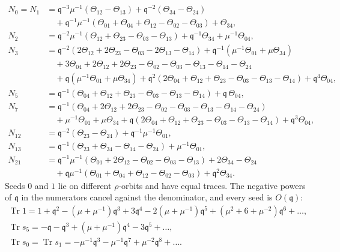 \documentclass[11pt]{amsart}
\DeclareMathOperator{\Tr}{Tr}
\newcommand\fq{\mathfrak{q}}
\theoremstyle{remark}
\begin{document}
\begin{equation}\label{eq:comp-e7-recipes}
\begin{aligned}
  N_0=N_1&=\fq^{-3}\mu^{-1}(\Theta_{12}-\Theta_{13})+\fq^{-2}(\Theta_{34}-\Theta_{24})\\
  &\quad+\fq^{-1}\mu^{-1}(\Theta_{01}+\Theta_{04}+\Theta_{12}-\Theta_{02}-\Theta_{03})+\Theta_{34},\\
  N_2&=\fq^{-2}\mu^{-1}(\Theta_{12}+\Theta_{23}-\Theta_{03}-\Theta_{13})+\fq^{-1}\Theta_{34}+\mu^{-1}\Theta_{04},\\
  N_3&=\fq^{-2}(2\Theta_{12}+2\Theta_{23}-\Theta_{03}-2\Theta_{13}-\Theta_{14})
    +\fq^{-1}(\mu^{-1}\Theta_{01}+\mu\Theta_{34})\\
  &\quad+3\Theta_{04}+2\Theta_{12}+2\Theta_{23}-\Theta_{02}-\Theta_{03}-\Theta_{13}-\Theta_{14}-\Theta_{24}\\
  &\quad+\fq(\mu^{-1}\Theta_{01}+\mu\Theta_{34})
    +\fq^{2}(2\Theta_{04}+\Theta_{12}+\Theta_{23}-\Theta_{03}-\Theta_{13}-\Theta_{14})+\fq^{4}\Theta_{04},\\
  N_5&=\fq^{-1}(\Theta_{04}+\Theta_{12}+\Theta_{23}-\Theta_{03}-\Theta_{13}-\Theta_{14})+\fq\,\Theta_{04},\\
  N_7&=\fq^{-1}(\Theta_{04}+2\Theta_{12}+2\Theta_{23}-\Theta_{02}-\Theta_{03}-\Theta_{13}-\Theta_{14}-\Theta_{24})\\
  &\quad+\mu^{-1}\Theta_{01}+\mu\Theta_{34}
    +\fq(2\Theta_{04}+\Theta_{12}+\Theta_{23}-\Theta_{03}-\Theta_{13}-\Theta_{14})+\fq^{3}\Theta_{04},\\
  N_{12}&=\fq^{-2}(\Theta_{23}-\Theta_{24})+\fq^{-1}\mu^{-1}\Theta_{01},\\
  N_{13}&=\fq^{-1}(\Theta_{23}+\Theta_{34}-\Theta_{14}-\Theta_{24})+\mu^{-1}\Theta_{01},\\
  N_{21}&=\fq^{-1}\mu^{-1}(\Theta_{01}+2\Theta_{12}-\Theta_{02}-\Theta_{03}-\Theta_{13})+2\Theta_{34}-\Theta_{24}\\
  &\quad+\fq\mu^{-1}(\Theta_{01}+\Theta_{04}+\Theta_{12}-\Theta_{02}-\Theta_{03})+\fq^{2}\Theta_{34}.
\end{aligned}
\end{equation}
Seeds $0$ and $1$ lie on different $\rho$-orbits and have equal traces.  The
negative powers of $\fq$ in the numerators cancel against the denominator, and
every seed is $O(\fq)$:
\begin{equation}\label{eq:comp-e7-heads}
\begin{gathered}
  \Tr1=1+\fq^2-(\mu+\mu^{-1})\fq^3+3\fq^4-2(\mu+\mu^{-1})\fq^5+(\mu^2+6+\mu^{-2})\fq^6+\dots,\\
  \Tr s_5=-\fq-\fq^3+(\mu+\mu^{-1})\fq^4-3\fq^5+\dots,\\
  \Tr s_0=\Tr s_1=-\mu^{-1}\fq^3-\mu^{-1}\fq^7+\mu^{-2}\fq^8+\dots .
\end{gathered}
\end{equation}
\end{document}
